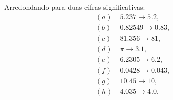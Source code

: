 Arredondando para duas cifras significativas:
\begin{align*}
(a)\;&5.237 \to 5.2, \\
(b)\;&0.82549 \to 0.83, \\
(c)\;&81.356 \to 81, \\
(d)\;&\pi \to 3.1, \\
(e)\;&6.2305 \to 6.2, \\
(f)\;&0.0428 \to 0.043, \\
(g)\;&10.45 \to 10, \\
(h)\;&4.035 \to 4.0.
\end{align*}

